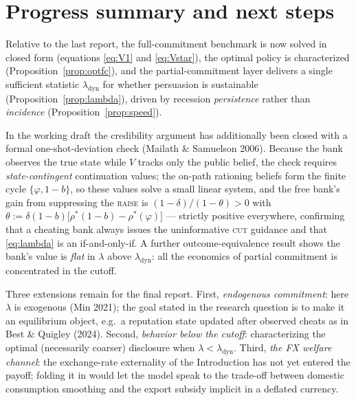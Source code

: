 \documentclass[12pt]{article}
\begin{document}
\section{Progress summary and next steps}\label{Progress}

Relative to the last report, the full-commitment benchmark is now solved in closed form (equations \eqref{eq:V1} and \eqref{eq:Vstar}), the optimal policy is characterized (Proposition~\ref{prop:optfc}), and the partial-commitment layer delivers a single sufficient statistic $\lambda_{\mathrm{dyn}}$ for whether persuasion is sustainable (Proposition~\ref{prop:lambda}), driven by recession \emph{persistence} rather than \emph{incidence} (Proposition~\ref{prop:speed}).

In the working draft the credibility argument has additionally been closed with a formal one-shot-deviation check (Mailath \& Samuelson 2006). Because the bank observes the true state while $V$ tracks only the public belief, the check requires \emph{state-contingent} continuation values; the on-path rationing beliefs form the finite cycle $\{\varphi, 1-b\}$, so these values solve a small linear system, and the free bank's gain from suppressing the \textsc{raise} is $(1-\delta)/(1-\theta) > 0$ with $\theta := \delta(1-b)\big[\rho^*(1-b) - \rho^*(\varphi)\big]$ --- strictly positive everywhere, confirming that a cheating bank always issues the uninformative \textsc{cut} guidance and that \eqref{eq:lambda} is an if-and-only-if. A further outcome-equivalence result shows the bank's value is \emph{flat} in $\lambda$ above $\lambda_{\mathrm{dyn}}$: all the economics of partial commitment is concentrated in the cutoff.

Three extensions remain for the final report. First, \emph{endogenous commitment}: here $\lambda$ is exogenous (Min 2021); the goal stated in the research question is to make it an equilibrium object, e.g.\ a reputation state updated after observed cheats as in Best \& Quigley (2024). Second, \emph{behavior below the cutoff}: characterizing the optimal (necessarily coarser) disclosure when $\lambda < \lambda_{\mathrm{dyn}}$. Third, \emph{the FX welfare channel}: the exchange-rate externality of the Introduction has not yet entered the payoff; folding it in would let the model speak to the trade-off between domestic consumption smoothing and the export subsidy implicit in a deflated currency.
\end{document}
